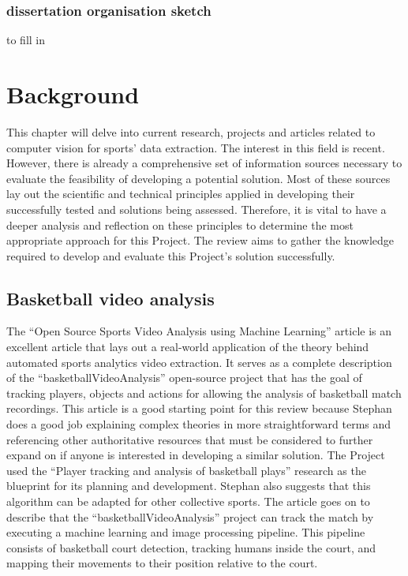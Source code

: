 \documentclass[
11pt,
twoside
]{report}
\begin{document}
\subsection{dissertation organisation sketch}


to fill in


\chapter{Background}


This chapter will delve into current research, projects and articles related to computer vision for sports' data extraction. The interest in this field is recent. However, there is already a comprehensive set of information sources necessary to evaluate the feasibility of developing a potential solution. Most of these sources lay out the scientific and technical principles applied in developing their successfully tested and solutions being assessed. Therefore, it is vital to have a deeper analysis and reflection on these principles to determine the most appropriate approach for this Project. The review aims to gather the knowledge required to develop and evaluate this Project's solution successfully.


\section{Basketball video analysis}


The ``Open Source Sports Video Analysis using Machine Learning'' article \cite{stephan} is an excellent article that lays out a real-world application of the theory behind automated sports analytics video extraction. It serves as a complete description of the ``basketballVideoAnalysis'' open-source project \cite{stephan_code} that has the goal of tracking players, objects and actions for allowing the analysis of basketball match recordings. This article is a good starting point for this review because Stephan does a good job explaining complex theories in more straightforward terms and referencing other authoritative resources that must be considered to further expand on if anyone is interested in developing a similar solution. The Project used the ``Player tracking and analysis of basketball plays'' \cite{baskettrack} research as the blueprint for its planning and development. Stephan also suggests that this algorithm can be adapted for other collective sports. The article \cite{stephan} goes on to describe that the ``basketballVideoAnalysis'' project can track the match by executing a machine learning and image processing pipeline. This pipeline consists of basketball court detection, tracking humans inside the court, and mapping their movements to their position relative to the court.
\end{document}
